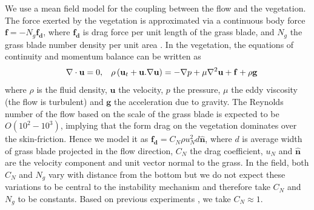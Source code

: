 \documentclass[aps,prl,twocolumn,superscriptaddress,10pt]{revtex4-1}  %
\newcommand{\bn}{{\boldsymbol{\hat{n}}}}
\newcommand{\bu}{\mathbf{u}}
\newcommand{\grad}{\mathbf{\nabla}}
\begin{document}
We use a mean field model for the coupling between the flow and the vegetation. 
The force exerted by the vegetation is approximated via a continuous body force $\mathbf{f}=-N_g\mathbf{f_d}$,  
where $\mathbf{f_{d}}$ is drag force per unit length of the grass blade, and $N_g$ the grass blade number density per unit area \cite{Vivoni98,Nepf99,Ghisal02,Delangre04,Delangre06}. 
In the vegetation, the equations of continuity and momentum balance can be written as 
\begin{equation}
\quad \grad\cdot\bu = 0,\hspace{3mm} \rho \left(\bu_{t}+\bu.\grad\bu \right) = -\grad p+\mu\grad^{2}\bu +\mathbf{f}+\rho\mathbf{g}
\label{navier-stokes}
\end{equation}
where $\rho$ is the fluid density, $\mathbf{u}$ the velocity, 
$p$ the pressure, $\mu$ the eddy viscosity (the flow is turbulent) and $\mathbf{g}$ the acceleration due to gravity. 
The Reynolds number of the flow based on the scale of the grass blade is expected to be $O(10^2-10^3)$, implying that the form drag on the vegetation dominates over the skin-friction. Hence we model it as 
$\mathbf{f_{d}}=C_N \rho u_{N}^{2}d\bn$, 
where $d$ is average width of grass blade projected in the flow direction, $C_{N}$ the drag coefficient, $u_{N}$ and $\bn$ are the velocity component and unit vector normal to the grass. 
In the field, both $C_N$ and $N_g$ vary with distance from the bottom but we do not expect these variations to be central to the instability mechanism and therefore take $C_N$ and $N_g$ to be constants. 
Based on previous experiments \cite{Vivoni98}, we take $C_N \approx 1$.
\newline
\end{document}
